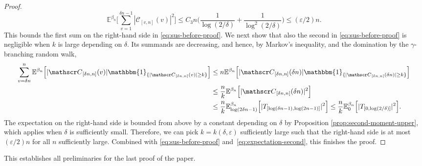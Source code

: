 \documentclass[a4paper, a4wide, 10pt, reqno]{amsart}
\theoremstyle{plain}
\theoremstyle{definition}
\numberwithin{equation}{section}
\newcommand{\E}{\mathbb E}
\newcommand{\sC}{{\mathscr C}}
\newcommand{\ind}[1]{\mathbbm{1}_{\{#1\}}}
\begin{document}
\begin{proof}
\begin{equation}
    \E^{\beta_n}\Bigg[\sum_{v=1}^{\delta n-1} |\sC_{[v, n]}(v)|^2\Bigg]
    \le C_3n\bigg(\frac{1}{\log(2/\delta)} + \frac{1}{\log^2(2/\delta)}\bigg)\le (\varepsilon/2) n.
    \end{equation}
    This bounds the first sum on the right-hand side in \eqref{eq:sus-before-proof}. We next show that also the second in  \eqref{eq:sus-before-proof} is negligible when $k$ is large depending on $\delta$. Its summands are decreasing, and hence, by Markov's inequality, and the domination by the $\gamma$-branching random walk,
    \[
    \begin{aligned}
    \sum_{v=\delta n}^{n}\E^{\beta_n}\Big[ |\sC_{[\delta n, n]}(v)|\ind{|\sC_{[\delta n, n]}(v)|\ge k}\Big]&\le n\E^{\beta_n}\Big[ |\sC_{[\delta n, n]}(\delta n)|\ind{|\sC_{[\delta n, n]}(\delta n)|\ge k}\Big]\\&\le \frac{n}{k}\E^{\beta_n}\Big[ |\sC_{[\delta n, n]}(\delta n)|^2\Big]\\
    &\le \frac{n}{k}\E^{\beta_n}_{\log(2\delta n-1)}\Big[ |T_{[\log(\delta n-1), \log (2n-1)]}|^2\Big]\le \frac{n}{k}\E^{\beta_n}_0\Big[ |T_{[0,\log(2/\delta)]}|^2\Big].
    \end{aligned}
    \]
    The expectation on the right-hand side is bounded from above by a constant depending on $\delta$ by Proposition \ref{prop:second-moment-upper}, which applies when $\delta$ is sufficiently small. Therefore, 
    we can pick $k=k(\delta,\varepsilon)$ sufficiently large such that the right-hand side is at most $(\varepsilon/2)n$ for all $n$ sufficiently large. Combined with \eqref{eq:sus-before-proof} and~\eqref{eq:expectation-second}, this finishes the proof.
\end{proof}
This establishes all preliminaries for the last proof of the paper.
\end{document}
